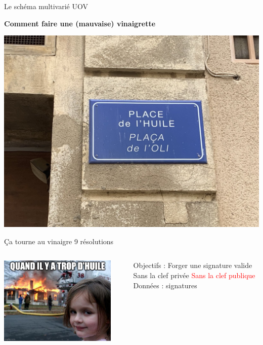 \begin{frame}{Le schéma multivarié UOV}
    \large{\centerline{\textbf{Comment faire une (mauvaise) vinaigrette}}}
     \centering
    \includegraphics[trim=12cm 8cm 8cm 8cm, clip, width=0.5\linewidth]{img/meme/UOV-vac.jpg}
\end{frame}


\begin{frame}{Ça tourne au vinaigre \FiveStar\FiveStar\FiveStar \hfill 9 résolutions}
    \begin{columns}[c]
        \begin{center}                  
            \includegraphics[width=0.9\textwidth]{img/meme/uov-intro.png}
        \end{center}

           \begin{outline}
               \1 Objectifs :
                \2 Forger une signature valide
                \2 Sans la clef privée
                \pause
                \2 \textcolor{red}{Sans la clef publique}
                \pause
               \1 Données :
                     signatures

           \end{outline}
    \end{columns}
\end{frame}

